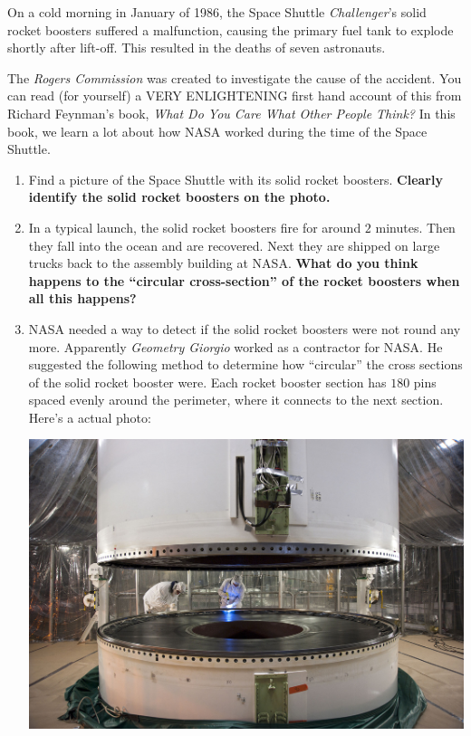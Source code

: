 \documentclass[nooutcomes,noauthor,hints,handout]{ximera}
\begin{document}
\begin{question}
  On a cold morning in January of 1986, the Space Shuttle
  \textit{Challenger}'s solid rocket boosters suffered a malfunction,
  causing the primary fuel tank to explode shortly after lift-off.
  This resulted in the deaths of seven astronauts. 


  The \textit{Rogers Commission} was created to investigate the cause
  of the accident.  You can read (for yourself) a VERY ENLIGHTENING
  first hand account of this from Richard Feynman's book, \textit{What
    Do You Care What Other People Think?} In this book, we learn a lot
  about how NASA worked during the time of the Space Shuttle.

  \begin{enumerate}
  \item Find a picture of the Space Shuttle with its solid rocket
    boosters. \textbf{Clearly identify the solid rocket boosters on the photo.}
  \item In a typical launch, the solid rocket boosters fire for around
    $2$ minutes. Then they fall into the ocean and are recovered. Next
    they are shipped on large trucks back to the assembly
    building at NASA. \textbf{What do you think happens to the ``circular
    cross-section'' of the rocket boosters when all this happens?}
  \item NASA needed a way to detect if the solid rocket boosters were
    not round any more. Apparently \textit{Geometry Giorgio} worked as
    a contractor for NASA. He suggested the following method to
    determine how ``circular'' the cross sections of the solid rocket
    booster were. Each rocket booster section has $180$ pins spaced
    evenly around the perimeter, where it connects to the next
    section. Here's a actual photo:
    \begin{center}%
      \includegraphics[width=.6\textwidth]{srbSections.jpg}

\end{center}
\end{enumerate}
\end{question}
\end{document}

